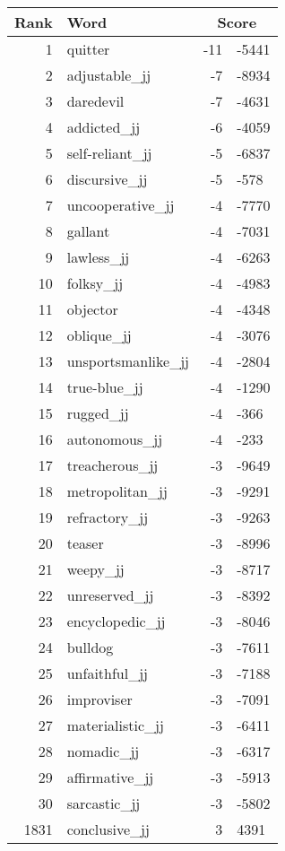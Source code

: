 \begin{longtable}[!htbp]{| rlr@{.}l |}
    \hline
    \textbf{Rank} & \textbf{Word} & \multicolumn{2}{c|}{\textbf{Score}} \\
    \hline
    \endhead
    1 & quitter & -11 & -5441 \\
    2 & adjustable\_jj & -7 & -8934 \\
    3 & daredevil & -7 & -4631 \\
    4 & addicted\_jj & -6 & -4059 \\
    5 & self-reliant\_jj & -5 & -6837 \\
    6 & discursive\_jj & -5 & -578 \\
    7 & uncooperative\_jj & -4 & -7770 \\
    8 & gallant & -4 & -7031 \\
    9 & lawless\_jj & -4 & -6263 \\
    10 & folksy\_jj & -4 & -4983 \\
    11 & objector & -4 & -4348 \\
    12 & oblique\_jj & -4 & -3076 \\
    13 & unsportsmanlike\_jj & -4 & -2804 \\
    14 & true-blue\_jj & -4 & -1290 \\
    15 & rugged\_jj & -4 & -366 \\
    16 & autonomous\_jj & -4 & -233 \\
    17 & treacherous\_jj & -3 & -9649 \\
    18 & metropolitan\_jj & -3 & -9291 \\
    19 & refractory\_jj & -3 & -9263 \\
    20 & teaser & -3 & -8996 \\
    21 & weepy\_jj & -3 & -8717 \\
    22 & unreserved\_jj & -3 & -8392 \\
    23 & encyclopedic\_jj & -3 & -8046 \\
    24 & bulldog & -3 & -7611 \\
    25 & unfaithful\_jj & -3 & -7188 \\
    26 & improviser & -3 & -7091 \\
    27 & materialistic\_jj & -3 & -6411 \\
    28 & nomadic\_jj & -3 & -6317 \\
    29 & affirmative\_jj & -3 & -5913 \\
    30 & sarcastic\_jj & -3 & -5802 \\
    1831 & conclusive\_jj & 3 & 4391 \\

\end{longtable}
